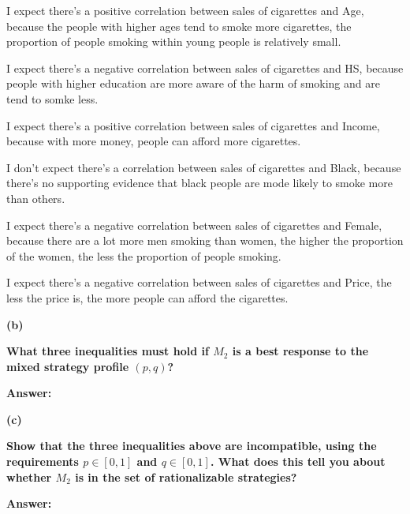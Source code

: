 \documentclass[letterpaper,11pt]{article}
\begin{document}
I expect there's a positive correlation between sales of cigarettes and Age, because the people with higher ages tend to smoke more cigarettes, the proportion of people smoking within young people is relatively small.\par
I expect there's a negative correlation between sales of cigarettes and HS, because people with higher education are more aware of the harm of smoking and are tend to somke less.\par
I expect there's a positive correlation between sales of cigarettes and Income, because with more money, people can afford more cigarettes.\par
I don't expect there's a correlation between sales of cigarettes and Black, because there's no supporting evidence that black people are mode likely to smoke more than others.\par
I expect there's a negative correlation between sales of cigarettes and Female, because there are a lot more men smoking than women, the higher the proportion of the women, the less the proportion of people smoking.\par
I expect there's a negative correlation between sales of cigarettes and Price, the less the price is, the more people can afford the cigarettes.\par


\begin{addmargin}[-1.1em]{0em}
\textbf{(b)}\par\end{addmargin}
  \textbf{What three inequalities must hold if $M_2$ is a best response to the mixed strategy profile $(p,q)$?}\par
\bigbreak
\begin{addmargin}[-0.5em]{0em}
\textbf{Answer: }\end{addmargin}


\begin{addmargin}[-1.1em]{0em}
\textbf{(c)}\par\end{addmargin}
  \textbf{Show that the three inequalities above are incompatible, using the requirements $p \in [0,1]$ and $q \in [0,1]$. What does this tell you about whether $M_2$ is in the set of rationalizable strategies?}\par
\bigbreak
\begin{addmargin}[-0.5em]{0em}
\textbf{Answer: }\end{addmargin}
\end{document}
